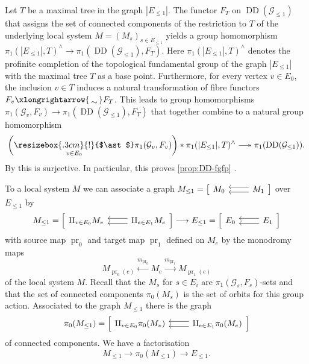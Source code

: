 \documentclass[a4paper,twoside,11pt,reqno]{amsart}
\newcommand{\cG}{{\mathcal G}}
\DeclareRobustCommand\longtwoheadrightarrow {\relbar\joinrel\twoheadrightarrow}
\newcommand{\surj}{\longtwoheadrightarrow}
\newcommand{\isomto}{\xlongrightarrow{\,\smash{\raisebox{-0.65ex} 
    {\ensuremath{\displaystyle\sim}}}\,}}
\newcommand{\la}{\longrightarrow}
\DeclareMathOperator{\pr}{pr}
\DeclareMathOperator{\Desc}{DD}
\theoremstyle{definition}
\numberwithin{equation}{subsection}
\begin{document}
Let $T$ be a maximal tree in the graph $|E_{\leq 1}|$. The functor $F_T$ on $\Desc(\cG_{\leq 1})$ that assigns the set of connected components of the restriction to $T$ of the underlying local system $M = (M_s)_{s \in E_{\leq 1}}$ yields a group homomorphism $\pi_1(|E_{\leq 1}|,T)^\wedge \to \pi_1(\Desc(\cG_{\leq 1}),F_T)$. Here $\pi_1(|E_{\leq 1}|,T)^\wedge$ denotes the profinite completion of the topological fundamental group of the graph $|E_{\leq 1}|$ with the maximal tree $T$ as a base point. Furthermore, for every vertex $v \in E_0$, the inclusion $v \in T$ induces a natural transformation of fibre functors $F_v \isomto F_T$. This leads to group homomorphisms $\pi_1(\cG_v,F_v) \to \pi_1(\Desc(\cG_{\leq 1}),F_T)$ that together combine to a natural group homomorphism
\[
    \bigg(\underset{v \in E_0}{\resizebox{.3cm}{!}{$\ast$}} \pi_1(\cG_v,F_v)\bigg)  \ast \pi_1(|E_{\leq 1}|,T)^\wedge \surj \pi_1(\Desc(\cG_{\leq 1}))  .
\]
By \cite[Proposition~2.7]{Stix2006:vanKampen} this is surjective. In particular, this proves \cref{prop:DD-fgfp} .

To a local system $M$ we can associate a graph $M_{\leq 1} = \big[\begin{tikzcd}
M_0 & \ar[l,shift right=0.7ex] \ar[l,shift left=0.7ex]  M_1 
\end{tikzcd}\big]$ over $E_{\leq 1}$ by 
\[
M_{\leq 1} = 
\Big[\begin{tikzcd}
\amalg_{v \in E_0} M_v & \ar[l,shift right=0.7ex] \ar[l,shift left=0.7ex] \amalg_{e \in E_1} M_e 
\end{tikzcd}\Big] 
\la
E_{\leq 1} = \Big[\begin{tikzcd}
E_0 & \ar[l,shift right=0.7ex] \ar[l,shift left=0.7ex] E_1 
\end{tikzcd}\Big]
\]
with source map $\pr_0$ and target  map  $\pr_1$ defined on $M_e$ by the monodromy maps
\[
M_{\pr_0(e)} \xleftarrow{m_{\pr_0}} M_e  \xrightarrow{m_{\pr_1}} M_{\pr_1(e)}
\]
of the local system $M$.
Recall that the $M_s$ for $s \in E_i$ are $\pi_1(\cG_s,F_s)$-sets and that the set of connected components $\pi_0(M_s)$ is the set of orbits for this group action. Associated to the graph $M_{\leq 1}$ there is the graph 
\[
\pi_0(M_{\leq 1}) = 
\Big[\begin{tikzcd}
\amalg_{v \in E_0} \pi_0(M_v) & \ar[l,shift right=0.7ex] \ar[l,shift left=0.7ex] \amalg_{e \in E_1} \pi_0(M_e) 
\end{tikzcd}\Big]
\]
of connected components. We have a factorisation
\[
M_{\leq 1} \la \pi_0(M_{\leq 1}) \la E_{\leq 1}.
\]
\end{document}
